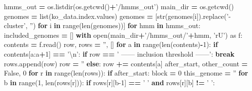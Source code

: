 \documentclass[
]{article}
\newenvironment{Shaded}{\begin{snugshade}}{\end{snugshade}}
\newcommand{\BuiltInTok}[1]{#1}
\newcommand{\CharTok}[1]{\textcolor[rgb]{0.31,0.60,0.02}{#1}}
\newcommand{\ControlFlowTok}[1]{\textcolor[rgb]{0.13,0.29,0.53}{\textbf{#1}}}
\newcommand{\DecValTok}[1]{\textcolor[rgb]{0.00,0.00,0.81}{#1}}
\newcommand{\ImportTok}[1]{#1}
\newcommand{\KeywordTok}[1]{\textcolor[rgb]{0.13,0.29,0.53}{\textbf{#1}}}
\newcommand{\NormalTok}[1]{#1}
\newcommand{\OperatorTok}[1]{\textcolor[rgb]{0.81,0.36,0.00}{\textbf{#1}}}
\newcommand{\StringTok}[1]{\textcolor[rgb]{0.31,0.60,0.02}{#1}}
\newcommand{\VariableTok}[1]{\textcolor[rgb]{0.00,0.00,0.00}{#1}}
\begin{document}
\begin{Shaded}
\begin{Highlighting}[]
\NormalTok{hmms_out }\OperatorTok{=}\NormalTok{ os.listdir(os.getcwd()}\OperatorTok{+}\StringTok{'/hmms_out'}\NormalTok{)}
\NormalTok{main_dir }\OperatorTok{=}\NormalTok{ os.getcwd()}
\NormalTok{genomes }\OperatorTok{=} \BuiltInTok{list}\NormalTok{(ko_data.index.values)}
\NormalTok{genomes }\OperatorTok{=}\NormalTok{ [}\BuiltInTok{str}\NormalTok{(genomes[i]).replace(}\StringTok{'-cluster'}\NormalTok{, }\StringTok{''}\NormalTok{) }\ControlFlowTok{for}\NormalTok{ i }\KeywordTok{in} \BuiltInTok{range}\NormalTok{(}\BuiltInTok{len}\NormalTok{(genomes))]}
\ControlFlowTok{for}\NormalTok{ hmm }\KeywordTok{in}\NormalTok{ hmms_out:}
\NormalTok{    included_genomes }\OperatorTok{=}\NormalTok{ []}
    \ControlFlowTok{with} \BuiltInTok{open}\NormalTok{(main_dir}\OperatorTok{+}\StringTok{'/hmms_out/'}\OperatorTok{+}\NormalTok{hmm, }\StringTok{'rU'}\NormalTok{) }\ImportTok{as}\NormalTok{ f:}
\NormalTok{        contents }\OperatorTok{=}\NormalTok{ f.read()}
\NormalTok{    row, rows }\OperatorTok{=} \StringTok{''}\NormalTok{, []}
    \ControlFlowTok{for}\NormalTok{ a }\KeywordTok{in} \BuiltInTok{range}\NormalTok{(}\BuiltInTok{len}\NormalTok{(contents)}\OperatorTok{-}\DecValTok{1}\NormalTok{):}
        \ControlFlowTok{if}\NormalTok{ contents[a:a}\OperatorTok{+}\DecValTok{1}\NormalTok{] }\OperatorTok{==} \StringTok{'}\CharTok{\textbackslash{}n}\StringTok{'}\NormalTok{:}
            \ControlFlowTok{if}\NormalTok{ row }\OperatorTok{==} \StringTok{'  ------ inclusion threshold ------'}\NormalTok{:}
                \ControlFlowTok{break}
\NormalTok{            rows.append(row)}
\NormalTok{            row }\OperatorTok{=} \StringTok{''}
        \ControlFlowTok{else}\NormalTok{:}
\NormalTok{            row }\OperatorTok{+=}\NormalTok{ contents[a]}
\NormalTok{    after_start, other_count }\OperatorTok{=} \VariableTok{False}\NormalTok{, }\DecValTok{0}
    \ControlFlowTok{for}\NormalTok{ r }\KeywordTok{in} \BuiltInTok{range}\NormalTok{(}\BuiltInTok{len}\NormalTok{(rows)):}
        \ControlFlowTok{if}\NormalTok{ after_start:}
\NormalTok{            block }\OperatorTok{=} \DecValTok{0}
\NormalTok{            this_genome }\OperatorTok{=} \StringTok{''}
            \ControlFlowTok{for}\NormalTok{ b }\KeywordTok{in} \BuiltInTok{range}\NormalTok{(}\DecValTok{1}\NormalTok{, }\BuiltInTok{len}\NormalTok{(rows[r])):}
                \ControlFlowTok{if}\NormalTok{ rows[r][b}\DecValTok{-1}\NormalTok{] }\OperatorTok{==} \StringTok{' '} \KeywordTok{and}\NormalTok{ rows[r][b] }\OperatorTok{!=} \StringTok{' '}\NormalTok{:}

\end{Highlighting}
\end{Shaded}
\end{document}
